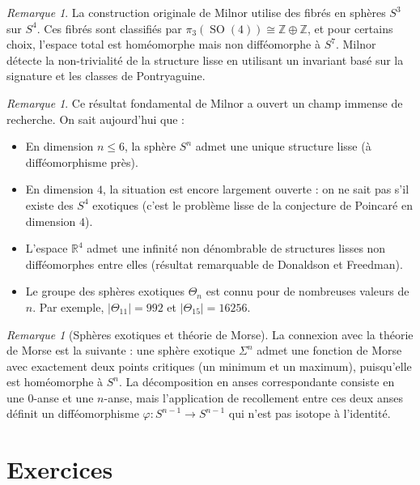 \documentclass[12pt,a4paper,openany]{book}
\theoremstyle{definition}
\theoremstyle{plain}
\theoremstyle{remark}
\newtheorem{remarque}[definition]{Remarque}
\newcommand{\Z}{\mathbb{Z}}
\newcommand{\R}{\mathbb{R}}
\DeclareMathOperator{\SO}{SO}
\newcommand{\abs}[1]{\left|#1\right|}
\begin{document}
\begin{remarque}
La construction originale de Milnor utilise des fibrés en sphères $S^3$ sur
$S^4$. Ces fibrés sont classifiés par $\pi_3(\SO(4)) \cong \Z \oplus \Z$, et
pour certains choix, l'espace total est homéomorphe mais non difféomorphe à $S^7$.
Milnor détecte la non-trivialité de la structure lisse en utilisant un invariant
basé sur la signature et les classes de Pontryaguine.
\end{remarque}

\begin{remarque}
Ce résultat fondamental de Milnor a ouvert un champ immense de recherche. On
sait aujourd'hui que :
\begin{itemize}
  \item En dimension $n \leqslant 6$, la sphère $S^n$ admet une unique
    structure lisse (à difféomorphisme près).
  \item En dimension $4$, la situation est encore largement ouverte : on ne sait
    pas s'il existe des $S^4$ exotiques (c'est le problème lisse de la
    conjecture de Poincaré en dimension $4$).
  \item L'espace $\R^4$ admet une infinité non dénombrable de structures lisses
    non difféomorphes entre elles (résultat remarquable de Donaldson et
    Freedman).
  \item Le groupe des sphères exotiques $\Theta_n$ est connu pour de nombreuses
    valeurs de $n$. Par exemple, $\abs{\Theta_{11}} = 992$ et $\abs{\Theta_{15}} = 16256$.
\end{itemize}
\end{remarque}

\begin{remarque}[Sphères exotiques et théorie de Morse]
La connexion avec la théorie de Morse est la suivante : une sphère exotique
$\Sigma^n$ admet une fonction de Morse avec exactement deux points critiques
(un minimum et un maximum), puisqu'elle est homéomorphe à $S^n$. La décomposition
en anses correspondante consiste en une $0$-anse et une $n$-anse, mais
l'application de recollement entre ces deux anses définit un difféomorphisme
$\varphi : S^{n-1} \to S^{n-1}$ qui n'est pas isotope à l'identité.
\end{remarque}

\section{Exercices}\label{sec:whitney-exos}
\end{document}

